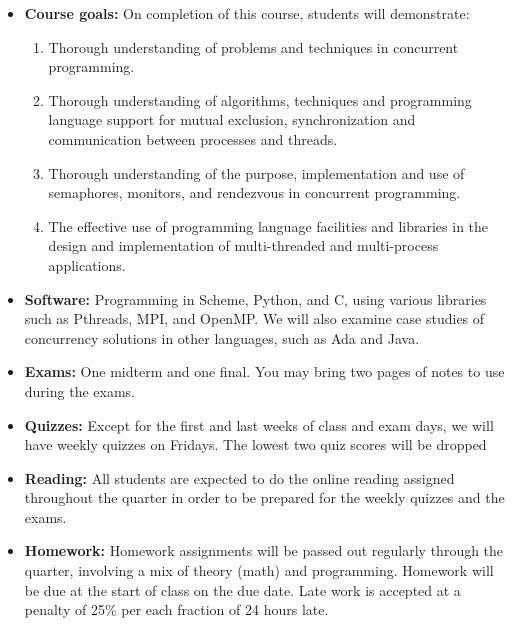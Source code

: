 \documentclass{article}
\begin{document}
\begin{itemize}
\begin{multicols}{2}
\begin{itemize}
\item Paradigms for process interaction:  bag of tasks, heartbeat,
  pipeline, {\em etc.}
\end{itemize}
\end{multicols}
\item
{\bf Course goals:}
On completion of this course, students will demonstrate: 
\begin{multicols}{2}
  \begin{enumerate}
  \item Thorough understanding of problems and techniques in
    concurrent programming.
\item Thorough understanding of algorithms, techniques and programming
  language support for mutual exclusion, synchronization and
  communication between processes and threads.
\item Thorough understanding of the purpose, implementation and use of
  semaphores, monitors, and rendezvous in concurrent programming.
\item The effective use of programming language facilities and
  libraries in the design and implementation of multi-threaded and
  multi-process applications.

  \end{enumerate}
\end{multicols}
\item {\bf Software:} Programming in Scheme, Python, and C, using
  various libraries such as Pthreads, MPI, and OpenMP.  We will also
  examine case studies of concurrency solutions in other languages,
  such as Ada and Java.

\item {\bf Exams:}   One
  midterm and one final.  You may bring two pages of notes to use
  during the exams.

\item {\bf Quizzes:} Except for the first and last weeks of class and
  exam days, we will have weekly quizzes on Fridays.  The lowest two
  quiz scores will be dropped

\item {\bf Reading:} All students are expected to do the online
  reading assigned throughout the quarter in order to be prepared for
  the weekly quizzes and the exams.

\item {\bf Homework:}  Homework assignments will be passed out
  regularly through the quarter, involving a mix of theory (math) and
  programming.   Homework will be due at the start of
  class on the due date.  Late work is accepted at a penalty
  of 25\% per each fraction of 24 hours late.


\end{itemize}
\end{document}
